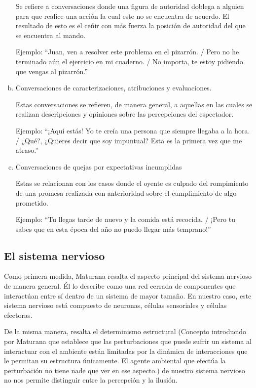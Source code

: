 \documentclass[10pt]{article}
\begin{document}
\begin{enumerate}[a.]
        Se refiere a conversaciones donde una figura de autoridad doblega a alguien para que realice una acción la cual este no se encuentra de acuerdo. El resultado de esto es el ceñir con más fuerza la posición de autoridad del que se encuentra al mando.
                
        Ejemplo: ``Juan, ven a resolver este problema en el pizarrón. / Pero no he terminado aún el ejercicio en mi cuaderno. / No importa, te estoy pidiendo que vengas al pizarrón.''
        
        \item Conversaciones de caracterizaciones, atribuciones y evaluaciones.
            
        Estas conversaciones se refieren, de manera general, a aquellas en las cuales se realizan descripciones y opiniones sobre las percepciones del espectador. 
                
        Ejemplo: ``¡Aquí estás! Yo te creía una persona que siempre llegaba a la hora. / ¿Qué?, ¿Quieres decir que soy impuntual? Esta es la primera vez que me atraso.''
        
        \item Conversaciones de quejas por expectativas incumplidas
            
        Estas se relacionan con los casos donde el oyente es culpado del rompimiento de una promesa realizada con anterioridad sobre el cumplimiento de algo prometido.
                
        Ejemplo: ``Tu llegas tarde de nuevo y la comida está recocida. / ¡Pero tu sabes que en esta época del año no puedo llegar más temprano!''

        \end{enumerate}

        \subsection{El sistema nervioso}

        Como primera medida, Maturana resalta el aspecto principal del sistema nervioso de manera general. Él lo describe como una red cerrada de componentes que interactúan entre sí dentro de un sistema de mayor tamaño. En nuestro caso, este sistema nervioso está compuesto de neuronas, células sensoriales y células efectoras. 

        De la misma manera, resalta el determinismo estructural (Concepto introducido por Maturana que establece que las perturbaciones que puede sufrir un sistema al interactuar con el ambiente están limitadas por la dinámica de interacciones que le permitan su estructura únicamente. El agente ambiental que efectúa la perturbación no tiene nade que ver en ese aspecto.) de nuestro sistema nervioso no nos permite distinguir entre la percepción y la ilusión. 
\end{document}
